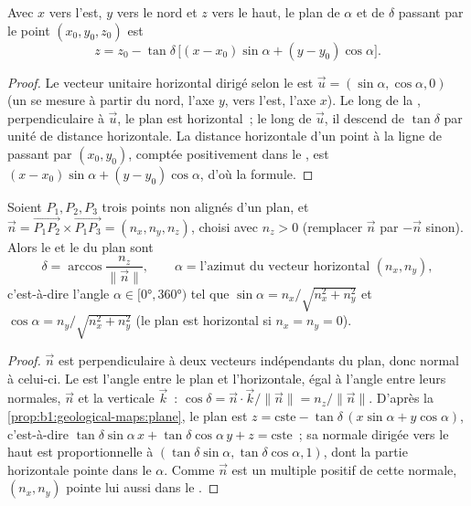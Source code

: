 \begin{proposition}\label{prop:b1:geological-maps:plane}
Avec $x$ vers l'est, $y$ vers le nord et $z$ vers le haut, le plan de  $\alpha$ et de  $\delta$ passant par le point $(x_0, y_0, z_0)$ est
\[
  z = z_0 - \tan\delta\,\bigl[(x - x_0)\sin\alpha + (y - y_0)\cos\alpha\bigr].
\]
\end{proposition}

\begin{proof}
Le vecteur unitaire horizontal dirigé selon le  est
$\vec u = (\sin\alpha, \cos\alpha, 0)$ (un  se mesure à partir du nord,
l'axe $y$, vers l'est, l'axe $x$). Le long de la , perpendiculaire à
$\vec u$, le plan est horizontal~; le long de $\vec u$, il descend de
$\tan\delta$ par unité de distance horizontale. La distance horizontale d'un
point à la ligne de  passant par $(x_0, y_0)$, comptée positivement
dans le , est $(x-x_0)\sin\alpha + (y-y_0)\cos\alpha$, d'où la
formule.
\end{proof}

\begin{theorem}\label{thm:b1:geological-maps:three-point}
Soient $P_1, P_2, P_3$ trois points non alignés d'un plan, et
$\vec n = \overrightarrow{P_1P_2} \times \overrightarrow{P_1P_3} =
(n_x, n_y, n_z)$, choisi avec $n_z > 0$ (remplacer $\vec n$ par $-\vec n$
sinon). Alors le  et le  du plan sont
\[
  \delta = \arccos\frac{n_z}{\|\vec n\|}, \qquad
  \alpha = \text{l'azimut du vecteur horizontal } (n_x, n_y),
\]
c'est-à-dire l'angle $\alpha \in [\ang{0}, \ang{360})$ tel que
$\sin\alpha = n_x/\sqrt{n_x^2+n_y^2}$ et $\cos\alpha = n_y/\sqrt{n_x^2+n_y^2}$
(le plan est horizontal si $n_x = n_y = 0$).
\end{theorem}

\begin{proof}
$\vec n$ est perpendiculaire à deux vecteurs indépendants du plan, donc normal à
celui-ci. Le  est l'angle entre le plan et l'horizontale, égal à l'angle
entre leurs normales, $\vec n$ et la verticale
$\vec k$~: $\cos\delta = \vec n \cdot \vec k / \|\vec n\| = n_z/\|\vec n\|$.
D'après la \cref{prop:b1:geological-maps:plane}, le plan est $z = \text{cste} -
\tan\delta\,(x\sin\alpha + y\cos\alpha)$, c'est-à-dire
$\tan\delta\sin\alpha\,x + \tan\delta\cos\alpha\,y + z = \text{cste}$~; sa
normale dirigée vers le haut est proportionnelle à $(\tan\delta\sin\alpha,
\tan\delta\cos\alpha, 1)$, dont la partie horizontale pointe dans le  $\alpha$. Comme $\vec n$ est un multiple positif de cette normale,
$(n_x, n_y)$ pointe lui aussi dans le .
\end{proof}

